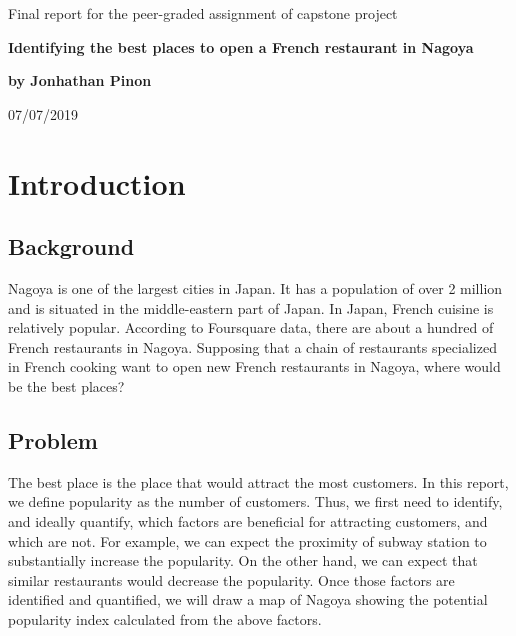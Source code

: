 \documentclass[12pt,a4paper]{article}
\begin{document}
%

\begin{titlepage}

\vspace{5 cm}

\begin{center}

\Huge Final report for the peer-graded assignment of capstone project

\vspace{3 cm}

\Huge \textbf{Identifying the best places to open a French restaurant in Nagoya}

\vspace{2 cm}

\Large \textbf{by Jonhathan Pinon} \\

\vspace{2 cm}


\large 07/07/2019


\end{center}

\end{titlepage}

\section{Introduction}

\subsection{Background}


Nagoya is one of the largest cities in Japan. It has a population of over 2 million and is situated in the middle-eastern part of Japan. In Japan, French cuisine is relatively popular. According to Foursquare data, there are about a hundred of French restaurants in Nagoya. Supposing that a chain of restaurants specialized in French cooking want to open new French restaurants in Nagoya, where would be the best places? 

\subsection{Problem}

The best place is the place that would attract the most customers. In this report, we define popularity as the number of customers. Thus, we first need to identify, and ideally quantify, which factors are beneficial for attracting customers, and which are not. For example, we can expect the proximity of subway station to substantially increase the popularity. On the other hand, we can expect that similar restaurants would decrease the popularity. Once those factors are identified and quantified, we will draw a map of Nagoya showing the potential popularity index calculated from the above factors. 
\end{document}
